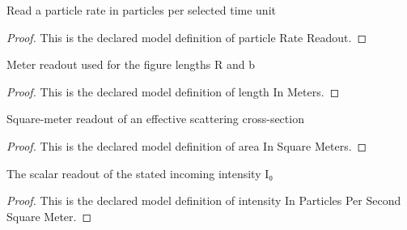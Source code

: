 \begin{definition}
  \label{def:physics:phyx-mini-0562:phyxminiproblems-problemphyxmini0562-particleratereadout}
  Read a particle rate in particles per selected time unit
\end{definition}
\begin{proof}
  This is the declared model definition of particle Rate Readout.
\end{proof}
\begin{definition}
  \label{def:physics:phyx-mini-0562:phyxminiproblems-problemphyxmini0562-lengthinmeters}
  Meter readout used for the figure lengths R and b
\end{definition}
\begin{proof}
  This is the declared model definition of length In Meters.
\end{proof}
\begin{definition}
  \label{def:physics:phyx-mini-0562:phyxminiproblems-problemphyxmini0562-areainsquaremeters}
  Square-meter readout of an effective scattering cross-section
\end{definition}
\begin{proof}
  This is the declared model definition of area In Square Meters.
\end{proof}
\begin{definition}
  \label{def:physics:phyx-mini-0562:phyxminiproblems-problemphyxmini0562-intensityinparticlespersecondsquaremeter}
  The scalar readout of the stated incoming intensity I₀
\end{definition}
\begin{proof}
  This is the declared model definition of intensity In Particles Per Second Square Meter.
\end{proof}
